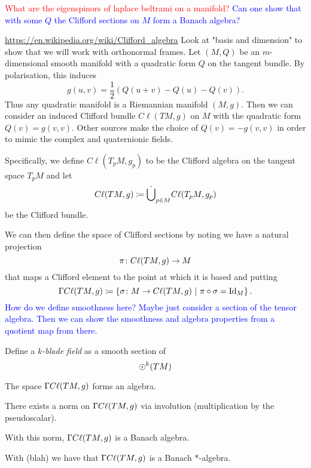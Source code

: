 \textcolor{red}{What are the eigenspinors of laplace beltrami on a manifold?}
\textcolor{blue}{Can one show that with some $Q$ the Clifford sections on $M$ form a Banach algebra?}

\url{https://en.wikipedia.org/wiki/Clifford_algebra} Look at "basis and dimension" to show that we will work with orthonormal frames.
Let $(M,Q)$ be an $m$-dimensional smooth manifold with a quadratic form $Q$ on the tangent bundle.  By polarisation, this induces 
\[
g(u,v)=\frac{1}{2}(Q(u+v)-Q(u)-Q(v)).
\]
Thus any quadratic manifold is a Riemannian manifold $(M,g)$.  Then we can consider an induced Clifford bundle $C\ell(TM,g)$ on $M$ with the quadratic form $Q(v)=g(v,v)$. Other sources make the choice of $Q(v)=-g(v,v)$ in order to mimic the complex and quaternionic fields.  

Specifically, we define $C\ell(T_pM,g_p)$ to be the Clifford algebra on the tangent space $T_pM$ and let
\[
C\ell(TM,g) \coloneqq \dot{\bigcup}_{p\in M} C\ell (T_pM,g_p)
\]
be the Clifford bundle.

We can then define the space of Clifford sections by noting we have a natural projection
\[
\pi \colon C\ell(TM,g) \to M
\]
that maps a Clifford element to the point at which it is based and putting
\[
\Gamma C\ell(TM,g) \coloneqq \left\{ \sigma \colon M \to C\ell(TM,g) ~\vert~ \pi \circ \sigma = \mathrm{Id}_M\right\}.
\]
\textcolor{blue}{How do we define smoothness here? Maybe just consider a section of the tensor algebra.  Then we can show the smoothness and algebra properties from a quotient map from there.}

\begin{definition}
Define a \emph{$k$-blade field} as a smooth section of
\[
\Large{\odot}^k(TM)
\]
\end{definition}

\begin{proposition}
The space $\Gamma C\ell (TM,g)$ forms an algebra.
\end{proposition}

\begin{proposition}
There exists a norm on $\Gamma C\ell (TM,g)$ via involution (multiplication by the pseudoscalar).
\end{proposition}

\begin{proposition}
With this norm, $\Gamma C\ell (TM,g)$ is a Banach algebra.
\end{proposition}

\begin{proposition}
With (blah) we have that $\Gamma C\ell (TM,g)$ is a Banach *-algebra.
\end{proposition}


